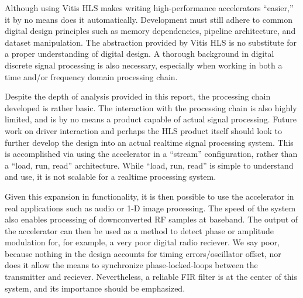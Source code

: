 \documentclass[11pt]{report}
\begin{document}
 Although using Vitis HLS makes writing high-performance accelerators ``easier,'' it by no means does it automatically. Development must still adhere to common digital design principles such as memory dependencies, pipeline architecture, and dataset manipulation. The abstraction provided by Vitis HLS is no substitute for a proper understanding of digital design. A thorough background in digital discrete signal processing is also necessary, especially when working in both a time and/or frequency domain processing chain.
 
 Despite the depth of analysis provided in this report, the processing chain developed is rather basic. The interaction with the processing chain is also highly limited, and is by no means a product capable of actual signal processing. Future work on driver interaction and perhaps the HLS product itself should look to further develop the design into an actual realtime signal processing system. This is accomplished via using the accelerator in a ``stream'' configuration, rather than a ``load, run, read'' architecture. While ``load, run, read'' is simple to understand and use, it is not scalable for a realtime processing system. 
 
 Given this expansion in functionality, it is then possible to use the accelerator in real applications such as audio or 1-D image processing. The speed of the system also enables processing of downconverted RF samples at baseband. The output of the accelerator can then be used as a method to detect phase or amplitude modulation for, for example, a very poor digital radio reciever. We say poor, because nothing in the design accounts for timing errors/oscillator offset, nor does it allow the means to synchronize phase-locked-loops between the transmitter and reciever. Nevertheless, a reliable FIR filter is at the center of this system, and its importance should be emphasized.
     
\end{document}
